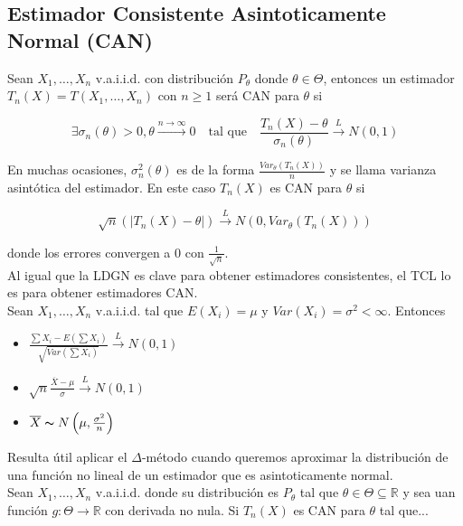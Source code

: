 \subsection{Estimador Consistente Asintoticamente Normal (CAN)}

Sean $X_1,\dots,X_n$ v.a.i.i.d. con distribución $P_\theta$ donde $\theta \in \Theta$, entonces un estimador $T_n(X)=T(X_1,\dots,X_n)$ con $n\geq 1$ será CAN para $\theta$ si

\[
    \exists \sigma_n(\theta) > 0, \theta \xrightarrow{n\to\infty}0 \quad \text{tal que}\quad \frac{T_n(X)-\theta}{\sigma_n(\theta)}\overset{L}{\to}N(0,1)
\]

En muchas ocasiones, $\sigma^2_n(\theta)$ es de la forma $\frac{Var_\theta(T_n(X))}{n}$ y se llama varianza asintótica del estimador. En este caso $T_n(X)$ es CAN para $\theta$ si

\[
    \sqrt{n}(|T_n(X)-\theta|) \overset{L}{\to} N(0, Var_\theta(T_n(X)))
\]

donde los errores convergen a 0 con $\frac{1}{\sqrt{n}}$. \\

Al igual que la LDGN es clave para obtener estimadores consistentes, el TCL lo es para obtener estimadores CAN. \\
Sean $X_1,\dots,X_n$ v.a.i.i.d. tal que $E(X_i)=\mu$ y $Var(X_i)=\sigma^2 < \infty$. Entonces

\begin{itemize}
    \item $\frac{\sum{X_i} - E(\sum{X_i})}{\sqrt{Var(\sum{X_i})}} \overset{L}{\to} N(0,1)$
    \item $\sqrt{n}\frac{\overline{X}-\mu}{\sigma}\overset{L}{\to}N(0,1)$
    \item $\overline{X}\thicksim N\left(\mu,\frac{\sigma^2}{n}\right)$
\end{itemize}

Resulta útil aplicar el $\Delta$-método cuando queremos aproximar la distribución de una función no lineal de un estimador que es asintoticamente normal.\\
Sean $X_1,\dots,X_n$ v.a.i.i.d. donde su distribución es $P_\theta$ tal que $\theta \in \Theta \subseteq \mathbb{R}$ y sea uan función $g:\Theta \to \mathbb{R}$ con derivada no nula. Si $T_n(X)$ es CAN para $\theta$ tal que...
